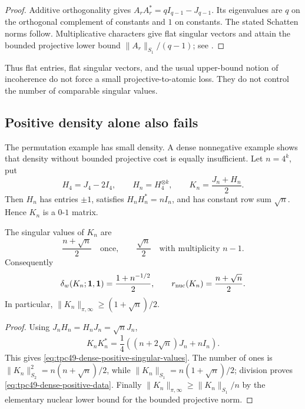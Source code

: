 \begin{proof}
Additive orthogonality gives
\(A_rA_r^*=qI_{q-1}-J_{q-1}\).  Its eigenvalues are \(q\) on the
orthogonal complement of constants and \(1\) on constants.  The stated
Schatten norms follow.  Multiplicative characters give flat singular
vectors and attain the bounded projective lower bound
\(\|A_r\|_{S_1}/(q-1)\); see \citep{WangTPC36}.
\end{proof}

Thus flat entries, flat singular vectors, and the usual upper-bound
notion of incoherence do not force a small projective-to-atomic loss.
They do not control the number of comparable singular values.

\subsection{Positive density alone also fails}

The permutation example has small density.  A dense nonnegative example
shows that density without bounded projective cost is equally
insufficient.  Let \(n=4^k\), put
\begin{equation}
 H_4=J_4-2I_4,
 \qquad H_n=H_4^{\otimes k},
 \qquad K_n=\frac{J_n+H_n}{2}.
 \label{eq:tpc49-dense-Hadamard-mask}
\end{equation}
Then \(H_n\) has entries \(\pm1\), satisfies
\(H_nH_n^*=nI_n\), and has constant row sum \(\sqrt n\).  Hence
\(K_n\) is a \(0\)-\(1\) matrix.

\begin{proposition}
\label{prop:tpc49-dense-positive-mask}
The singular values of \(K_n\) are
\begin{equation}
 \frac{n+\sqrt n}{2}\quad\text{once},
 \qquad
 \frac{\sqrt n}{2}\quad\text{with multiplicity }n-1.
 \label{eq:tpc49-dense-positive-singular-values}
\end{equation}
Consequently
\begin{equation}
 \delta_w(K_n;\mathbf 1,\mathbf 1)
 =\frac{1+n^{-1/2}}2,
 \qquad
 r_{\rm nuc}(K_n)=\frac{n+\sqrt n}{2}.
 \label{eq:tpc49-dense-positive-data}
\end{equation}
In particular,
\(\|K_n\|_{\pi,\infty}\ge(1+\sqrt n)/2\).
\end{proposition}

\begin{proof}
Using \(J_nH_n=H_nJ_n=\sqrt nJ_n\),
\begin{equation}
 K_nK_n^*
 =\frac14\left((n+2\sqrt n)J_n+nI_n\right).
 \label{eq:tpc49-dense-positive-Gram}
\end{equation}
This gives \eqref{eq:tpc49-dense-positive-singular-values}.  The number
of ones is
\(\|K_n\|_{S_2}^2=n(n+\sqrt n)/2\), while
\(\|K_n\|_{S_1}=n(1+\sqrt n)/2\); division proves
\eqref{eq:tpc49-dense-positive-data}.  Finally
\(\|K_n\|_{\pi,\infty}\ge\|K_n\|_{S_1}/n\) by the elementary nuclear
lower bound for the bounded projective norm.
\end{proof}

